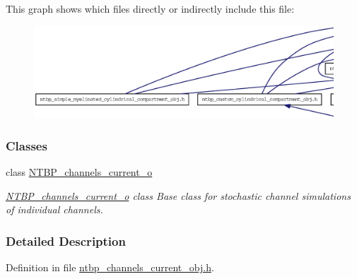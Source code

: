 This graph shows which files directly or indirectly include this file:
\nopagebreak
\begin{figure}[H]
\begin{center}
\leavevmode
\includegraphics[width=400pt]{ntbp__channels__current__obj_8h__dep__incl}
\end{center}
\end{figure}
\subsubsection*{Classes}
\begin{DoxyCompactItemize}
\item 
class \hyperlink{class_n_t_b_p__channels__current__o}{NTBP\_\-channels\_\-current\_\-o}
\begin{DoxyCompactList}\small\item\em \hyperlink{class_n_t_b_p__channels__current__o}{NTBP\_\-channels\_\-current\_\-o} class Base class for stochastic channel simulations of individual channels. \item\end{DoxyCompactList}\end{DoxyCompactItemize}


\subsubsection{Detailed Description}


Definition in file \hyperlink{ntbp__channels__current__obj_8h_source}{ntbp\_\-channels\_\-current\_\-obj.h}.


